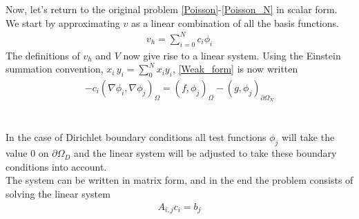 Now, let's return to the original problem \eqref{Poisson}-\eqref{Poisson_N} in scalar form. We start by approximating $v$ as a linear combination of all the basis functions. 
\begin{align}
v_h = \sum_{i=0}^N c_i \phi_i \label{u_hsum}
\end{align}
The definitions of $v_h$ and $V$ now give rise to a linear system. Using the Einstein summation convention, $x_i\,y_i = \sum_0^N x_i y_i $, \eqref{Weak_form} is now written 
\begin{align}
-c_i(\nabla \phi_i, \nabla \phi_j)_\Omega = (f,\phi_j)_\Omega - (g, \phi_j)_{\partial \Omega_N} \label{|linear_system}
\end{align}
\\
\\

In the case of Dirichlet boundary conditions all test functions $\phi_j$ will take the value 0 on $\partial \Omega_D$ and the linear system will be adjusted to take these boundary conditions into account. \\
The system can be written in matrix form, and in the end the problem consists of solving the linear system
\begin{align} A_{i,j}c_i = b_j \label{Matrix_1} \end{align}
\\
\\
